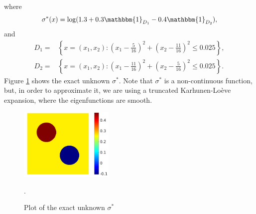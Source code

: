 \documentclass[10pt]{article}
\begin{document}
where
\begin{equation*}
\sigma^*(x) = \log (1.3 + 0.3 \mathbbm{1}_{D_1} - 0.4 \mathbbm{1}_{D_2}),
\end{equation*}
and
\begin{align*}
D_1 = & \left \{ x = (x_1,x_2) \colon \left ( x_1 - \frac{5}{16} \right )^2 + \left ( x_2 - \frac{11}{16} \right )^2 \le 0.025 \right \}, \\
D_2 = & \left \{ x = (x_1,x_2) \colon \left ( x_1 - \frac{11}{16} \right )^2 + \left ( x_2 - \frac{5}{16} \right )^2 \le 0.025 \right \}.
\end{align*}
Figure \ref{fig:exact_unknown} shows the exact unknown $\sigma^*$. Note that $\sigma^*$ is a non-continuous function, but, in order to approximate it, we are using a truncated Karhunen-Lo\`eve expansion, where the eigenfunctions are smooth.

\begin{figure}[t]
	\centering
	\includegraphics[width = 0.4\textwidth]{figures/sigma_exact}
	\caption{Plot of the exact unknown $\sigma^*$}.
	\label{fig:exact_unknown}
\end{figure}
\end{document}
